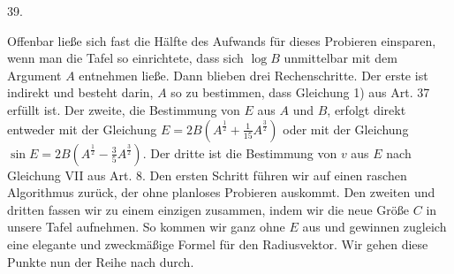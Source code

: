 \par{}
\begin{center}
\hypertarget{native-057-article039}{}39.
\end{center}
Offenbar ließe sich fast die Hälfte des Aufwands für dieses Probieren einsparen, wenn man die Tafel so einrichtete, dass sich $\log B$ unmittelbar mit dem Argument $A$ entnehmen ließe. Dann blieben drei Rechenschritte. Der erste ist indirekt und besteht darin, $A$ so zu bestimmen, dass Gleichung 1) aus Art. 37 erfüllt ist. Der zweite, die Bestimmung von $E$ aus $A$ und $B$, erfolgt direkt entweder mit der Gleichung $E=2B(A^{\frac{1}{2}}+\tfrac{1}{15}A^{\frac{3}{2}})$ oder mit der Gleichung $\sin E=2B(A^{\frac{1}{2}}-\tfrac{3}{5}A^{\frac{3}{2}})$. Der dritte ist die Bestimmung von $v$ aus $E$ nach Gleichung VII aus Art. 8. Den ersten Schritt führen wir auf einen raschen Algorithmus zurück, der ohne planloses Probieren auskommt. Den zweiten und dritten fassen wir zu einem einzigen zusammen, indem wir die neue Größe $C$ in unsere Tafel aufnehmen. So kommen wir ganz ohne $E$ aus und gewinnen zugleich eine elegante und zweckmäßige Formel für den Radiusvektor. Wir gehen diese Punkte nun der Reihe nach durch.

